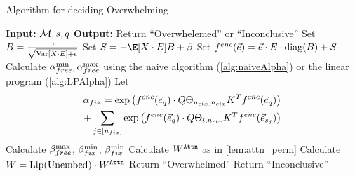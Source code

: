 %
%

\begin{algorithm}[h] 
	\caption{Algorithm for deciding Overwhelming}
	\label{alg:overwhelmCheck2}
	\begin{algorithmic}
		\STATE \textbf{Input:} $\mathcal{M}, {s}, q$
		\STATE \textbf{Output:} Return ``Overwhelemed'' or ``Inconclusive''
		\STATE
		\STATE Set $B = \frac{\gamma}{\sqrt{\mathrm{Var}[X \cdot E] + \epsilon}}
		$
		\STATE Set $
		S = - \E[X \cdot E] B + \beta
		$
		\STATE Set $f^{enc}(\vec{e}) = \vec{e} \cdot E \cdot \mathrm{diag}(B) + S$
		\STATE Calculate ${\alpha}_{free}^{\min}, {\alpha}_{free}^{\max}$ using the naive algorithm (\cref{alg:naiveAlpha}) or the linear program (\cref{alg:LPAlpha})
		\STATE Let
		\begin{align*}
			\alpha_{fix} = 
			\exp\left(
				f^{enc}(\vec{e}_q) \cdot Q \Theta_{{n_{ctx}}, {n_{ctx}}} K^T f^{enc}(\vec{e}_{q})
			\right)    \\
			+  \sum_{j \in [n_{fix}]} \exp\left(
				f^{enc}(\vec{e}_q) \cdot Q \Theta_{i, {n_{ctx}}} K^T f^{enc}(\vec{e}_{{s}_j})
			\right)
		\end{align*}
		\STATE Calculate ${\beta}_{free}^{\max}$, ${\beta}_{fix}^{\min}$, ${\beta}_{fix}^{\min}$
		 \STATE 
		 Calculate $W^{\texttt{Attn}}$ as in \cref{lem:attn_perm}
		\STATE Calculate $W = \mathrm{Lip}(\mathrm{Unembed}) \cdot W^{\texttt{Attn}} $ 
		\STATE Return ``Overwhelmed''
		\ELSE 
		\STATE Return ``Inconclusive''
		\ENDIF
	\end{algorithmic}
\end{algorithm}



